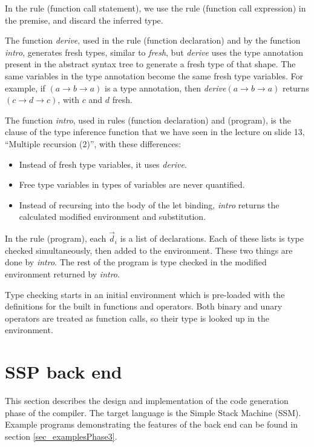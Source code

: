 \documentclass[a4paper]{article}
\newcommand{\arr}{\rightarrow}
\begin{document}
In the rule (function call statement), we use the rule (function call
expression) in the premise, and discard the inferred type.

The function \emph{derive}, used in the rule (function declaration) and by the
function \emph{intro}, generates fresh types, similar to \emph{fresh}, but
\emph{derive} uses the type annotation present in the abstract syntax tree to
generate a fresh type of that shape.  The same variables in the type annotation
become the same fresh type variables.  For example, if $(a \arr b \arr a)$ is a
type annotation, then \emph{derive}$(a \arr b \arr a)$ returns $(c \arr d \arr
c)$, with $c$ and $d$ fresh.

The function \emph{intro}, used in rules (function declaration) and (program),
is the clause of the type inference function that we have seen in the lecture on
slide 13, ``Multiple recursion (2)'', with these differences:

\begin{itemize}

  \item Instead of fresh type variables, it uses \emph{derive}.

  \item Free type variables in types of variables are never quantified.

  \item Instead of recursing into the body of the let binding, \emph{intro}
  returns the calculated modified environment and substitution.

\end{itemize}

In the rule (program), each $\vec{d}_i$ is a list of declarations.  Each of
these lists is type checked simultaneously, then added to the environment.
These two things are done by \emph{intro}.  The rest of the program is type
checked in the modified environment returned by \emph{intro}.

Type checking starts in an initial environment which is pre-loaded with the
definitions for the built in functions and operators.  Both binary and unary
operators are treated as function calls, so their type is looked up in the
environment.


\section{SSP back end}

This section describes the design and implementation of the code generation
phase of the compiler.  The target language is the Simple Stack Machine (SSM).
Example programs demonstrating the features of the back end can be found in
section \ref{sec_examplesPhase3}.
\end{document}
